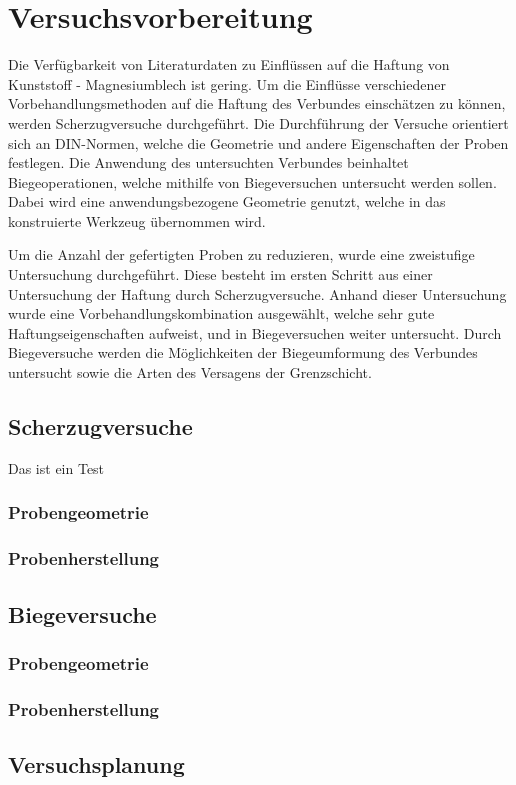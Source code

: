 \chapter{Versuchsvorbereitung}\label{cha:vorbereitung}

Die Verfügbarkeit von Literaturdaten zu Einflüssen auf die Haftung von Kunststoff - Magnesiumblech ist gering. Um die Einflüsse verschiedener Vorbehandlungsmethoden auf die Haftung des Verbundes einschätzen zu können, werden Scherzugversuche durchgeführt. Die Durchführung der Versuche orientiert sich an DIN-Normen, welche die Geometrie und andere Eigenschaften der Proben festlegen.
Die Anwendung des untersuchten Verbundes beinhaltet Biegeoperationen, welche mithilfe von Biegeversuchen untersucht werden sollen. Dabei wird eine anwendungsbezogene Geometrie genutzt, welche in das konstruierte Werkzeug übernommen wird.

Um die Anzahl der gefertigten Proben zu reduzieren, wurde eine zweistufige Untersuchung durchgeführt. Diese besteht im ersten Schritt aus einer Untersuchung der Haftung durch Scherzugversuche. Anhand dieser Untersuchung wurde eine Vorbehandlungskombination ausgewählt, welche sehr gute Haftungseigenschaften aufweist, und in Biegeversuchen weiter untersucht. Durch Biegeversuche werden die Möglichkeiten der Biegeumformung des Verbundes untersucht sowie die Arten des Versagens der Grenzschicht.

\section{Scherzugversuche}\label{sec:scherzug}
Das ist ein Test
\subsection{Probengeometrie}

\subsection{Probenherstellung}

\section{Biegeversuche}\label{sec:Biegen}

\subsection{Probengeometrie}

\subsection{Probenherstellung}

\section{Versuchsplanung}\label{sec:Planung}